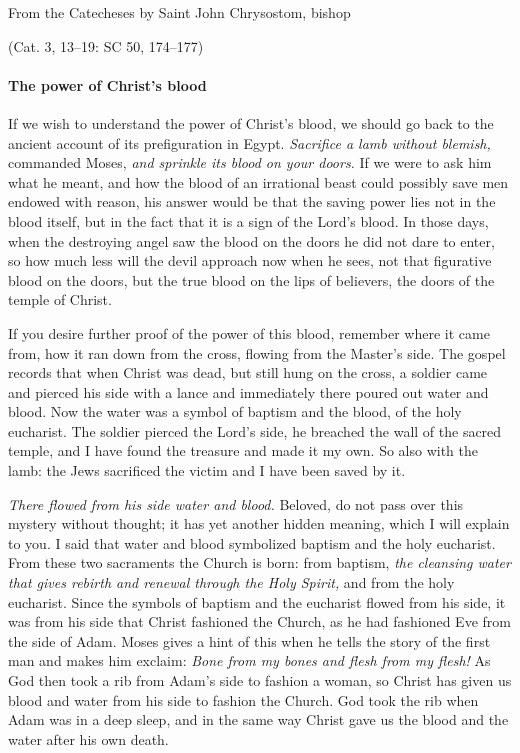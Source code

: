 From the Catecheses by Saint John Chrysostom, bishop

\par \hfill(Cat. 3, 13--19: SC 50, 174--177)

\paragraph{The power of Christ’s blood}

\lettrine[lines=3]{I}{}f we wish to understand the power of Christ’s blood, we should go back to the ancient account of its prefiguration in Egypt. \emph{Sacrifice a lamb without blemish,} commanded Moses, \emph{and sprinkle its blood on your doors.} If we were to ask him what he meant, and how the blood of an irrational beast could possibly save men endowed with reason, his answer would be that the saving power lies not in the blood itself, but in the fact that it is a sign of the Lord’s blood. In those days, when the destroying angel saw the blood on the doors he did not dare to enter, so how much less will the devil approach now when he sees, not that figurative blood on the doors, but the true blood on the lips of believers, the doors of the temple of Christ.

If you desire further proof of the power of this blood, remember where it came from, how it ran down from the cross, flowing from the Master’s side. The gospel records that when Christ was dead, but still hung on the cross, a soldier came and pierced his side with a lance and immediately there poured out water and blood. Now the water was a symbol of baptism and the blood, of the holy eucharist. The soldier pierced the Lord’s side, he breached the wall of the sacred temple, and I have found the treasure and made it my own. So also with the lamb: the Jews sacrificed the victim and I have been saved by it.

\emph{There flowed from his side water and blood.} Beloved, do not pass over this mystery without thought; it has yet another hidden meaning, which I will explain to you. I said that water and blood symbolized baptism and the holy eucharist. From these two sacraments the Church is born: from baptism, \emph{the cleansing water that gives rebirth and renewal through the Holy Spirit,} and from the holy eucharist. Since the symbols of baptism and the eucharist flowed from his side, it was from his side that Christ fashioned the Church, as he had fashioned Eve from the side of Adam. Moses gives a hint of this when he tells the story of the first man and makes him exclaim: \emph{Bone from my bones and flesh from my flesh!} As God then took a rib from Adam’s side to fashion a woman, so Christ has given us blood and water from his side to fashion the Church. God took the rib when Adam was in a deep sleep, and in the same way Christ gave us the blood and the water after his own death.

